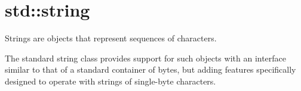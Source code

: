 \documentclass[main]{subfiles}
\begin{document}

\section{std::string}
\renewcommand{\arraystretch}{1.5}


Strings are objects that represent sequences of characters.

The standard string class provides support for such objects with an interface similar to that of a standard container of bytes, but adding features specifically designed to operate with strings of single-byte characters.
\end{document}

